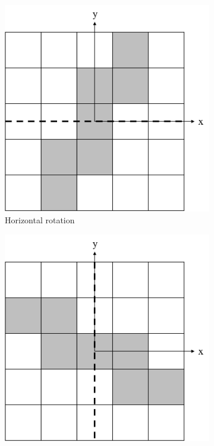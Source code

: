 \begin{figure}[H]
	\centering
	\begin{subfigure}[t]{0.3\textwidth}
		\centering
		\includegraphics[width=\textwidth]{LSSymRotH.png}
		\caption{Horizontal rotation}
	\end{subfigure}
	\hfill
	\begin{subfigure}[t]{0.3\textwidth}
		\centering
		\includegraphics[width=\textwidth]{LSSymRotV.png}

\end{subfigure}
\end{figure}
